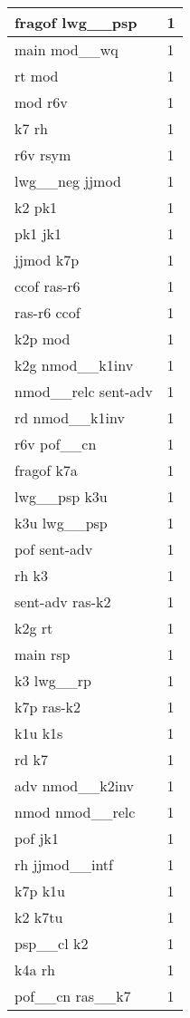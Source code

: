 \documentclass[a4 paper]{article}
\begin{document}
\begin{longtable}{p{}p{}}
fragof lwg\_\_psp  & 1 \\ \midrule
main mod\_\_wq  & 1 \\ \midrule
rt mod  & 1 \\ \midrule
mod r6v  & 1 \\ \midrule
k7 rh  & 1 \\ \midrule
r6v rsym  & 1 \\ \midrule
lwg\_\_neg jjmod  & 1 \\ \midrule
k2 pk1  & 1 \\ \midrule
pk1 jk1  & 1 \\ \midrule
jjmod k7p  & 1 \\ \midrule
ccof ras-r6  & 1 \\ \midrule
ras-r6 ccof  & 1 \\ \midrule
k2p mod  & 1 \\ \midrule
k2g nmod\_\_k1inv  & 1 \\ \midrule
nmod\_\_relc sent-adv  & 1 \\ \midrule
rd nmod\_\_k1inv  & 1 \\ \midrule
r6v pof\_\_cn  & 1 \\ \midrule
fragof k7a  & 1 \\ \midrule
lwg\_\_psp k3u  & 1 \\ \midrule
k3u lwg\_\_psp  & 1 \\ \midrule
pof sent-adv  & 1 \\ \midrule
rh k3  & 1 \\ \midrule
sent-adv ras-k2  & 1 \\ \midrule
k2g rt  & 1 \\ \midrule
main rsp  & 1 \\ \midrule
k3 lwg\_\_rp  & 1 \\ \midrule
k7p ras-k2  & 1 \\ \midrule
k1u k1s  & 1 \\ \midrule
rd k7  & 1 \\ \midrule
adv nmod\_\_k2inv  & 1 \\ \midrule
nmod nmod\_\_relc  & 1 \\ \midrule
pof jk1  & 1 \\ \midrule
rh jjmod\_\_intf  & 1 \\ \midrule
k7p k1u  & 1 \\ \midrule
k2 k7tu  & 1 \\ \midrule
psp\_\_cl k2  & 1 \\ \midrule
k4a rh  & 1 \\ \midrule
pof\_\_cn ras\_\_k7  & 1 \\ \midrule

\end{longtable}
\end{document}
